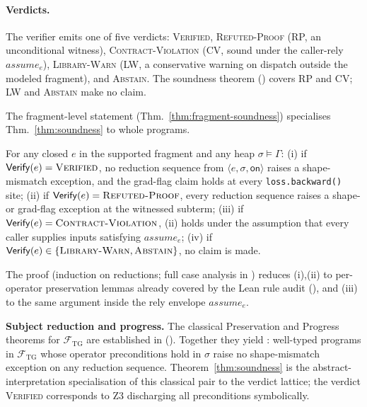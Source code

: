 \paragraph{Verdicts.} The verifier emits one of five verdicts:
\textsc{Verified}, \textsc{Refuted-Proof} (RP, an unconditional
witness), \textsc{Contract-Violation} (CV, sound under the
caller-rely $\mathit{assume}_e$), \textsc{Library-Warn} (LW, a
conservative warning on dispatch outside the modeled fragment),
and \textsc{Abstain}. The soundness theorem
() covers RP and CV; LW and \textsc{Abstain}
make no claim.



\noindent The fragment-level statement (Thm.~\ref{thm:fragment-soundness})
specialises Thm.~\ref{thm:soundness} to whole programs.

\begin{theorem}
\label{thm:soundness}
For any closed $e$ in the supported fragment and any heap
$\sigma\models\Gamma$:
(i) if $\mathsf{Verify}(e)=\textsc{Verified}$, no reduction
sequence from $\langle e,\sigma,\mathsf{on}\rangle$ raises a
shape-mismatch exception, and the grad-flag claim holds at
every \texttt{loss.backward()} site;
(ii) if $\mathsf{Verify}(e)=\textsc{Refuted-Proof}$, every
reduction sequence raises a shape- or grad-flag exception at
the witnessed subterm;
(iii) if $\mathsf{Verify}(e)=\textsc{Contract-Violation}$, (ii)
holds under the assumption that every caller supplies inputs
satisfying $\mathit{assume}_e$;
(iv) if $\mathsf{Verify}(e)\in\{\textsc{Library-Warn},\textsc{Abstain}\}$,
no claim is made.
\end{theorem}
The proof (induction on reductions; full case analysis in
) reduces (i),(ii) to per-operator
preservation lemmas already covered by the Lean rule audit
(), and (iii) to the same argument inside
the rely envelope $\mathit{assume}_e$.

\smallskip\noindent\textbf{Subject reduction and progress.}
The classical Preservation and Progress theorems for $\mathcal{F}_{\mathrm{TG}}$
are established in 
().
Together they yield : well-typed programs in
$\mathcal{F}_{\mathrm{TG}}$ whose operator preconditions hold in $\sigma$ raise no
shape-mismatch exception on any reduction sequence.
Theorem~\ref{thm:soundness} is the abstract-interpretation specialisation of this
classical pair to the verdict lattice; the verdict \textsc{Verified} corresponds
to Z3 discharging all preconditions symbolically.

